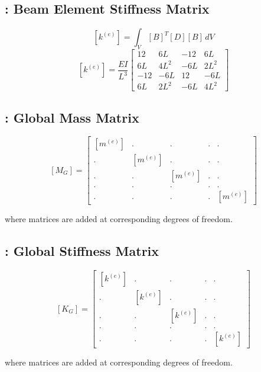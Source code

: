 \documentclass[a4paper, 12pt]{article}
\begin{document}
\subsection{: Beam Element Stiffness Matrix}
\begin{equation}
\left[ k^{\left( e \right)} \right] = \int_V \left[ B \right]^T \left[ D \right] \left[ B \right] \, dV
\end{equation}
\begin{equation}
\left[ k^{\left(e\right)} \right] = \frac{E I}{L^3}
\left[
\begin{matrix}
12&6L&-12&6L\\
6L&4L^2&-6L&2L^2\\
-12&-6L&12&-6L\\
6L&2L^2&-6L&4L^2
\end{matrix}
\right]
\end{equation}
\subsection{: Global Mass Matrix}
\begin{equation}
\left[M_G\right] = 
\left[
\begin{matrix}
\left[ m^{\left(e\right)} \right] & . & . & . & .\\
. & \left[ m^{\left(e\right)} \right] & . & . & .\\
. & . & \left[ m^{\left(e\right)} \right] & . & .\\
. & . & . & . & . \\
. & . & . & . & \left[ m^{\left(e\right)} \right]
\end{matrix}
\right]
\end{equation}
\begin{center}
where matrices are added at corresponding degrees of freedom.
\end{center}
\subsection{: Global Stiffness Matrix}
\begin{equation}
\left[K_G\right] = 
\left[
\begin{matrix}
\left[ k^{\left(e\right)} \right] & . & . & . & .\\
. & \left[ k^{\left(e\right)} \right] & . & . & .\\
. & . & \left[ k^{\left(e\right)} \right] & . & .\\
. & . & . & . & . \\
. & . & . & . & \left[ k^{\left(e\right)} \right]
\end{matrix}
\right]
\end{equation}
\begin{center}
where matrices are added at corresponding degrees of freedom.
\end{center}
\end{document}
